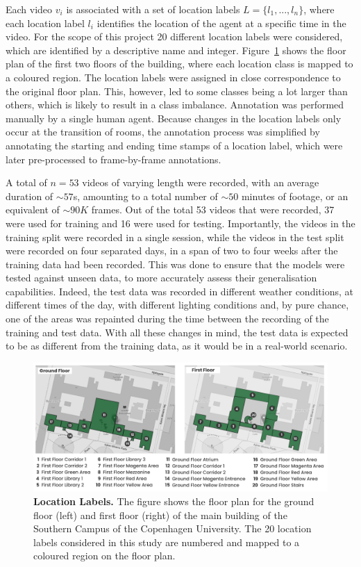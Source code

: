 \documentclass[a4paper]{article}
\begin{document}
Each video $v_i$ is associated with a set of location labels $L = \{l_1, ...,
l_n\}$, where each location label $l_i$ identifies the location of the agent at
a specific time in the video. For the scope of this project 20 different
location labels were considered, which are identified by a descriptive name and
integer. Figure~\ref{fig:location-labels} shows the floor plan of the first two
floors of the building, where each location class is mapped to a coloured
region. The location labels were assigned in close correspondence to the
original floor plan. This, however, led to some classes being a lot larger than
others, which is likely to result in a class imbalance. Annotation was performed
manually by a single human agent. Because changes in the location labels only
occur at the transition of rooms, the annotation process was simplified by
annotating the starting and ending time stamps of a location label, which were
later pre-processed to frame-by-frame annotations. 

A total of $n=53$ videos of varying length were recorded, with an average
duration of $\sim 57$s, amounting to a total number of $\sim 50$ minutes of
footage, or an equivalent of $\sim 90K$ frames. Out of the total 53 videos
that were recorded, 37 were used for training and 16 were used for testing.
Importantly, the videos in the training split were recorded in a single
session, while the videos in the test split were recorded on four separated
days, in a span of two to four weeks after the training data had been
recorded. This was done to ensure that the models were tested against unseen
data, to more accurately assess their generalisation capabilities. Indeed, the 
test data was recorded in different weather conditions, at different times of
the day, with different lighting conditions and, by pure chance, one of the
areas was repainted during the time between the recording of the training and
test data. With all these changes in mind, the test data is expected to be
as different from the training data, as it would be in a real-world scenario.

\begin{figure}
\centering
\includegraphics[width=\textwidth]{figures/location-labels.png}
\caption{
  \textbf{Location Labels.} The figure shows the floor plan for the ground floor
  (left) and first floor (right) of the main building of the Southern Campus of
  the Copenhagen University. The 20 location labels considered in this study are
  numbered and mapped to a coloured region on the floor plan.}

\label{fig:location-labels}
\end{figure}
\end{document}
